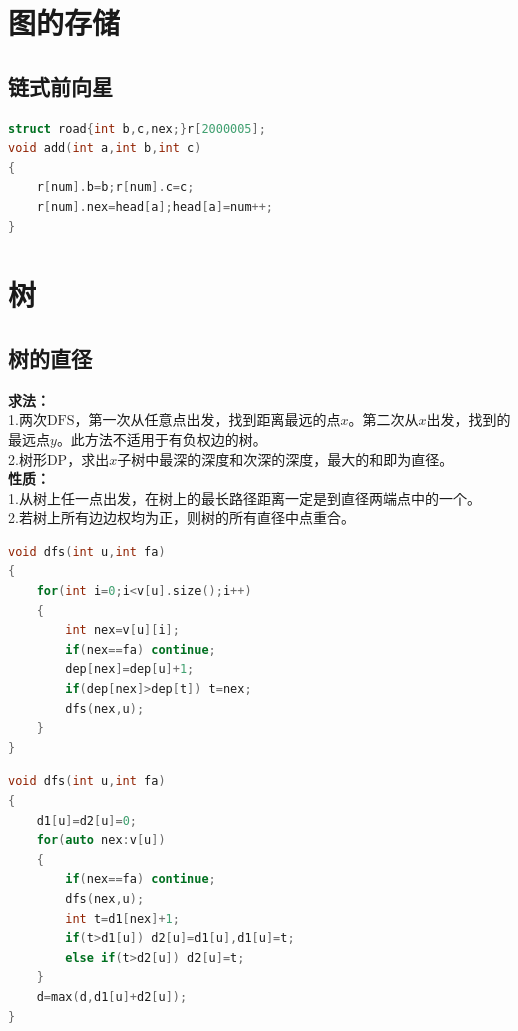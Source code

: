 \documentclass[a4paper]{book}
\begin{document}
\fi

\section{图的存储}

\subsection{链式前向星}

\begin{lstlisting}[language=C++]
struct road{int b,c,nex;}r[2000005];
void add(int a,int b,int c)
{
    r[num].b=b;r[num].c=c;
    r[num].nex=head[a];head[a]=num++;
}
\end{lstlisting}

\section{树}
\subsection{树的直径}
\noindent\textbf{求法：}\\
\indent1.两次$\mathrm{DFS}$，第一次从任意点出发，找到距离最远的点$x$。第二次从$x$出发，找到的最远点$y$。此方法不适用于有负权边的树。\\
\indent2.树形$\mathrm{DP}$，求出$x$子树中最深的深度和次深的深度，最大的和即为直径。\\
\noindent\textbf{性质：}\\
\indent1.从树上任一点出发，在树上的最长路径距离一定是到直径两端点中的一个。\\
\indent2.若树上所有边边权均为正，则树的所有直径中点重合。
\begin{lstlisting}[language=C++,title=方法1]
void dfs(int u,int fa)
{
    for(int i=0;i<v[u].size();i++)
    {
        int nex=v[u][i];
        if(nex==fa) continue;
        dep[nex]=dep[u]+1;
        if(dep[nex]>dep[t]) t=nex;
        dfs(nex,u);
    }
}
\end{lstlisting}
\begin{lstlisting}[language=C++,title=方法2]
void dfs(int u,int fa) 
{
    d1[u]=d2[u]=0;
    for(auto nex:v[u]) 
    {
        if(nex==fa) continue;
        dfs(nex,u);
        int t=d1[nex]+1;
        if(t>d1[u]) d2[u]=d1[u],d1[u]=t;
        else if(t>d2[u]) d2[u]=t;
    }
    d=max(d,d1[u]+d2[u]);
}
\end{lstlisting}
\end{document}
